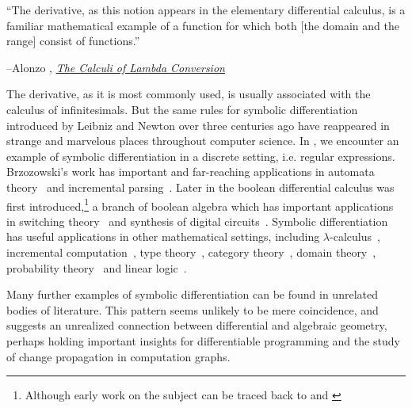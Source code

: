 \vspace{2pt}\setlength{\epigraphwidth}{0.65\textwidth}
\epigraph{``The derivative, as this notion appears in the elementary differential calculus, is a familiar mathematical example of a function for which both [the domain and the range] consist of functions.''}{\begin{flushright}--Alonzo \citet{church1941calculi}, \href{https://archive.org/details/AnnalsOfMathematicalStudies6ChurchAlonzoTheCalculiOfLambdaConversionPrincetonUniversityPress1941}{\textit{The Calculi of Lambda Conversion}}\end{flushright}}

The derivative, as it is most commonly used, is usually associated with the calculus of infinitesimals. But the same rules for symbolic differentiation introduced by Leibniz and Newton over three centuries ago have reappeared in strange and marvelous places throughout computer science. In \citet{brzozowski1964derivatives}, we encounter an example of symbolic differentiation in a discrete setting, i.e. regular expressions. Brzozowski's work has important and far-reaching applications in automata theory~\citep{berry1986regex, antimirov1996partial, champarnaud1999regular} and incremental parsing~\citep{might2011parsing, moss2014derivatives}. Later in \citet{thayse1981boolean} the boolean differential calculus was first introduced,\hspace{-.08em}\footnote{Although early work on the subject can be traced back to \citet{talantsev1959analysis} and \citet{sellers1968analyzing}} a branch of boolean algebra which has important applications in switching theory~\citep{thayse1973boolean} and synthesis of digital circuits~\citep{steinbach2017boolean}. Symbolic differentiation has useful applications in other mathematical settings, including $\lambda$-calculus~\citep{ehrhard2003differential, cai2014theory, kelly2016evolving, brunel2020backpropagation}, incremental computation~\citep{alvarez2019fixing, alvarez2019change}, type theory~\citep{mcbride2001derivative, mcbride2008clowns, chen2012type}, category theory~\citep{blute2006differential, blute2009cartesian}, domain theory~\citep{edalat2002domain}, probability theory~\citep{kac1951probability} and linear logic~\citep{ehrhard2018introduction, clift2018derivatives}.

Many further examples of symbolic differentiation can be found in unrelated bodies of literature. This pattern seems unlikely to be mere coincidence, and suggests an unrealized connection between differential and algebraic geometry, perhaps holding important insights for differentiable programming and the study of change propagation in computation graphs.

